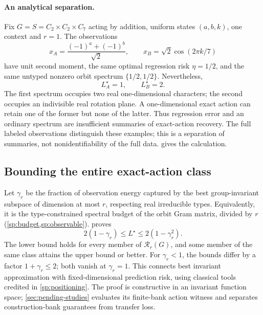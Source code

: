 \documentclass[10pt]{article}
\begin{document}
\paragraph{An analytical separation.}
Fix $G=S=C_2\times C_2\times C_7$ acting by addition, uniform states $(a,b,k)$, one context and $r=1$. The observations
\[
 x_A=\frac{(-1)^a+(-1)^b}{\sqrt2},\qquad
 x_B=\sqrt2\cos(2\pi k/7)
\]
have unit second moment, the same optimal regression risk $\eta=1/2$, and the same untyped nonzero orbit spectrum $\{1/2,1/2\}$. Nevertheless,
\[
 \boxed{\ L_A^\star=1,\qquad L_B^\star=2.\ }
\]
The first spectrum occupies two real one-dimensional characters; the second occupies an indivisible real rotation plane. A one-dimensional exact action can retain one of the former but none of the latter. Thus regression error and an ordinary spectrum are insufficient summaries of exact-action recovery. The full labeled observations distinguish these examples; this is a separation of summaries, not nonidentifiability of the full data.  gives the calculation.

\subsection{Bounding the entire exact-action class}
Let $\gamma_r$ be the fraction of observation energy captured by the best group-invariant subspace of dimension at most $r$, respecting real irreducible types. Equivalently, it is the type-constrained spectral budget of the orbit Gram matrix, divided by $r$ (\cref{sp:budget,sp:observable}).  proves
\[
 \boxed{\ 2(1-\gamma_r)\le L^\star\le2(1-\gamma_r^2).\ }
\]
The lower bound holds for every member of $\mathcal R_r(G)$, and some member of the same class attains the upper bound or better. For $\gamma_r<1$, the bounds differ by a factor $1+\gamma_r\le2$; both vanish at $\gamma_r=1$. This connects best invariant approximation with fixed-dimensional prediction risk, using classical tools credited in \cref{sp:positioning}. The proof is constructive in an invariant function space; \cref{sec:pending-studies} evaluates its finite-bank action witness and separates construction-bank guarantees from transfer loss.
\end{document}
